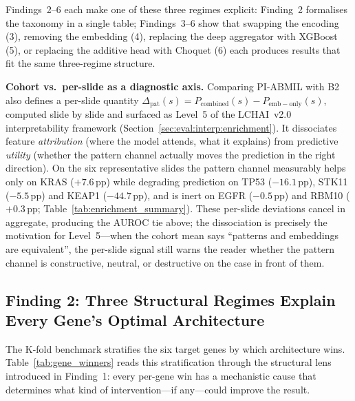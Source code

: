 Findings~2--6 each make one of these three regimes explicit:
Finding~2 formalises the taxonomy in a single table;
Findings~3--6 show that swapping the encoding (3),
removing the embedding (4), replacing the deep aggregator with
XGBoost (5), or replacing the additive head with Choquet (6) each
produces results that fit the same three-regime structure.

\textbf{Cohort vs.\ per-slide as a diagnostic axis.}
Comparing PI-ABMIL with B2 also defines a per-slide quantity
$\Delta_{\mathrm{pat}}(s) = P_{\mathrm{combined}}(s) -
P_{\mathrm{emb-only}}(s)$, computed slide by slide and surfaced as
Level~5 of the LCHAI~v2.0 interpretability framework
(Section~\ref{sec:eval:interp:enrichment}).
It dissociates feature \emph{attribution} (where the model attends,
what it explains) from predictive \emph{utility} (whether the
pattern channel actually moves the prediction in the right
direction).
On the six representative slides the pattern channel measurably
helps only on KRAS ($+7.6$\,pp) while degrading prediction on
TP53 ($-16.1$\,pp), STK11 ($-5.5$\,pp) and KEAP1 ($-44.7$\,pp), and
is inert on EGFR ($-0.5$\,pp) and RBM10 ($+0.3$\,pp;
Table~\ref{tab:enrichment_summary}).
These per-slide deviations cancel in aggregate, producing the
AUROC tie above; the dissociation is precisely the motivation for
Level~5---when the cohort mean says ``patterns and embeddings are
equivalent'', the per-slide signal still warns the reader whether
the pattern channel is constructive, neutral, or destructive on
the case in front of them.

\subsection{Finding 2: Three Structural Regimes Explain Every
Gene's Optimal Architecture}
\label{sec:eval:mutation:finding2}

The K-fold benchmark stratifies the six target genes by which
architecture wins.
Table~\ref{tab:gene_winners} reads this stratification through the
structural lens introduced in Finding~1: every per-gene win has a
mechanistic cause that determines what kind of intervention---if
any---could improve the result.

